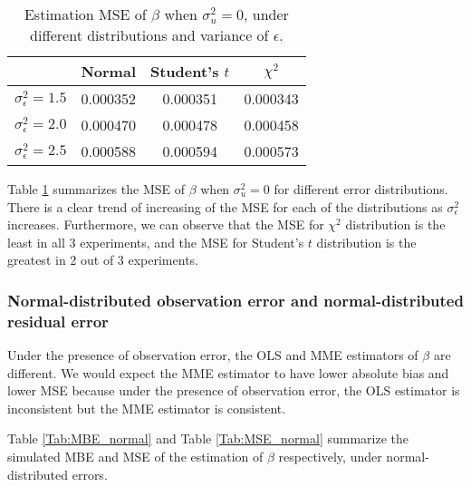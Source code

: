 \documentclass{article}
\begin{document}
\begin{table}[ht]
    \centering
    \caption{Estimation MSE of $\beta$ when $\sigma^2_u=0$, under different distributions and variance of $\epsilon$.}
    \label{Tab:MSE_absence}
    \begin{tabular}[t]{lccc}
        \hline
        &Normal&Student's $t$&$\chi^2$\\
        \hline
        $\sigma^2_\epsilon = 1.5$&0.000352&0.000351&0.000343\\
        $\sigma^2_\epsilon = 2.0$&0.000470&0.000478&0.000458\\
        $\sigma^2_\epsilon = 2.5$&0.000588&0.000594&0.000573\\
        \hline
    \end{tabular}
\end{table}

Table \ref{Tab:MSE_absence} summarizes the MSE of $\beta$ when $\sigma^2_u=0$ for different error distributions.
There is a clear trend of increasing of the MSE for each of the distributions as $\sigma^2_\epsilon$ increases. 
Furthermore, we can observe that the MSE for $\chi^2$ distribution is the least in all 3 experiments, and the MSE for Student's $t$ distribution is the greatest in 2 out of 3 experiments.

\subsubsection{Normal-distributed observation error and normal-distributed residual error}

Under the presence of observation error, the OLS and MME estimators of $\beta$ are different.
We would expect the MME estimator to have lower absolute bias and lower MSE because under the presence of observation error, the OLS estimator is inconsistent but the MME estimator is consistent.

Table \ref{Tab:MBE_normal} and Table \ref{Tab:MSE_normal} summarize the simulated MBE and MSE of the estimation of $\beta$ respectively, under normal-distributed errors.
\end{document}
